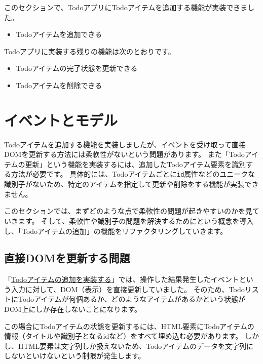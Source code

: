 このセクションで、TodoアプリにTodoアイテムを追加する機能が実装できました。

\begin{itemize}
\item
  Todoアイテムを追加できる
\end{itemize}

Todoアプリに実装する残りの機能は次のとおりです。

\begin{itemize}
\item
  Todoアイテムの完了状態を更新できる
\item
  Todoアイテムを削除できる
\end{itemize}

\hypertarget{event-model}{%
\section{イベントとモデル}\label{event-model}}

Todoアイテムを追加する機能を実装しましたが、イベントを受け取って直接DOMを更新する方法には柔軟性がないという問題があります。
また「Todoアイテムの更新」という機能を実装するには、追加したTodoアイテム要素を識別する方法が必要です。
具体的には、Todoアイテムごとに\texttt{id}属性などのユニークな識別子がないため、特定のアイテムを指定して更新や削除をする機能が実装できません。

このセクションでは、まずどのような点で柔軟性の問題が起きやすいのかを見ていきます。
そして、柔軟性や識別子の問題を解決するために\textbf{}という概念を導入し、「Todoアイテムの追加」の機能をリファクタリングしていきます。

\hypertarget{direct-dom-modification-issue}{%
\subsection{直接DOMを更新する問題}\label{direct-dom-modification-issue}}

「\hyperlink{form-event}{Todoアイテムの追加を実装する}」では、操作した結果発生したイベントという入力に対して、DOM（表示）を直接更新していました。
そのため、TodoリストにTodoアイテムが何個あるか、どのようなアイテムがあるかという状態がDOM上にしか存在しないことになります。

この場合にTodoアイテムの状態を更新するには、HTML要素にTodoアイテムの情報（タイトルや識別子となるidなど）をすべて埋め込む必要があります。
しかし、HTML要素は文字列しか扱えないため、Todoアイテムのデータを文字列にしないといけないという制限が発生します。

